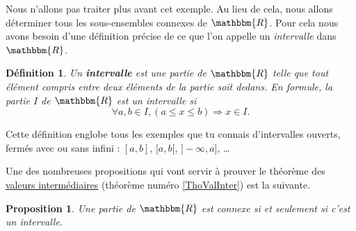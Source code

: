 \documentclass[a4paper,12pt]{book}
\newcommand{\eR}{\mathbbm{R}}
\newcounter{numtho}
\theoremstyle{mes_exemples}	\newtheorem{exemple}[numtho]{Exemple}
\theoremstyle{mes_tho}
\newtheorem{proposition}[numtho]{Proposition}
\newtheorem{definition}[numtho]{Définition}
\newcommand{\defe}[2]{\textbf{#1}\index{#2}}
\begin{document}
Nous n'allons pas traiter plus avant cet exemple. Au lieu de cela, nous allons déterminer tous les sous-ensembles connexes de $\eR$. Pour cela nous avons besoin d'une définition précise de ce que l'on appelle un \emph{intervalle} dans~$\eR$.
\begin{definition}
	Un \defe{intervalle}{Intervalle} est une partie de $\eR$ telle que tout élément compris entre deux éléments de la partie soit dedans. En formule, la partie $I$ de $\eR$ est un intervalle si
	\[
	  \forall a,b\in I,(a\leq x\leq b)\Rightarrow x\in I.
	\]
\end{definition}
Cette définition englobe tous les exemples que tu connais d'intervalles ouverts, fermés avec ou sans infini : $[a,b]$, $[a,b[$, $]-\infty,a]$, \ldots

Une des nombreuses propositions qui vont servir à prouver le théorème des \href{http://fr.wikipedia.org/wiki/Théorème_des_valeurs_intermédiaires}{valeurs intermédiaires} (théorème numéro \ref{ThoValInter}) est la suivante.
\begin{proposition}	\label{PropInterssiConn}
	Une partie de $\eR$ est connexe si et seulement si c'est un intervalle.
\end{proposition}
\end{document}
